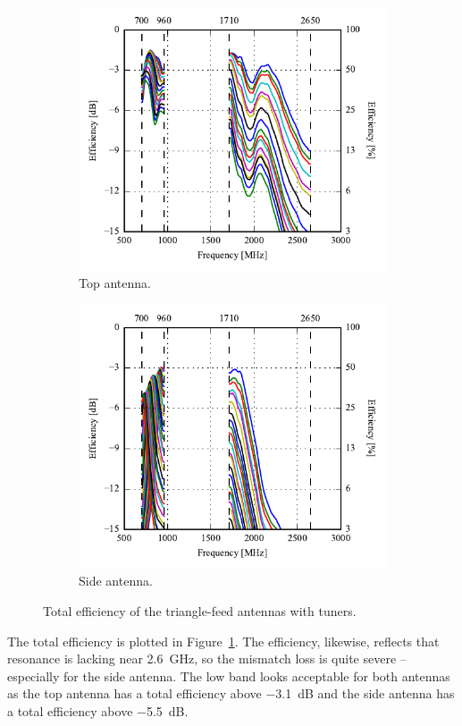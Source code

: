 \begin{figure}[htbp]
    \centering
    \begin{subfigure}{0.49\linewidth}
        \includegraphics{img/tech_sol/pcb_trianglefeed/efficiency_top}
        \caption{Top antenna.}
    \end{subfigure}
    \hfill
    \begin{subfigure}{0.49\linewidth}
        \includegraphics{img/tech_sol/pcb_trianglefeed/efficiency_side}
        \caption{Side antenna.}
    \end{subfigure}
    \caption{Total efficiency of the triangle-feed antennas with tuners.}
    \label{fig:triang_pcb_eff}
\end{figure}

The total efficiency is plotted in Figure~\ref{fig:triang_pcb_eff}. The efficiency, likewise, reflects that resonance is lacking near \SI{2.6}{GHz}, so the mismatch loss is quite severe -- especially for the side antenna. The low band looks acceptable for both antennas as the top antenna has a total efficiency above \SI{-3.1}{dB} and the side antenna has a total efficiency above \SI{-5.5}{dB}.
